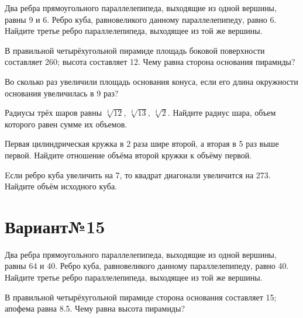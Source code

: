 \documentclass[4apaper]{article}
\begin{document}
\begin{taskBN}{1}
Два ребра прямоугольного параллелепипеда, выходящие из одной вершины, равны 9 и 6. Ребро куба, равновеликого данному параллелепипеду, равно 6. Найдите третье ребро параллелепипеда, выходящее из той же вершины.
\end{taskBN}

\begin{taskBN}{2}
В правильной четырёхугольной пирамиде площадь боковой поверхности составляет 260; высота составляет 12. Чему равна сторона основания пирамиды?
\end{taskBN}

\begin{taskBN}{3}
Во сколько раз увеличили площадь основания конуса, если его длина окружности основания увеличилась в 9 раз?
\end{taskBN}

\begin{taskBN}{4}
Радиусы трёх шаров равны $\sqrt[3]{12}$, $\sqrt[3]{13}$, $\sqrt[3]{2}$. Найдите радиус шара, объем которого равен сумме их объемов.
\end{taskBN}

\begin{taskBN}{5}
 Первая цилиндрическая кружка в 2 раза шире второй, а вторая в 5 раз выше первой. Найдите отношение объёма второй кружки к объёму первой.
\end{taskBN}

\begin{taskBN}{6}
Eсли ребро куба увеличить на 7, то квадрат диагонали увеличится на 273. Найдите объём исходного куба.
\end{taskBN}
\newpage\section*{Вариант№15}

\begin{taskBN}{1}
Два ребра прямоугольного параллелепипеда, выходящие из одной вершины, равны 64 и 40. Ребро куба, равновеликого данному параллелепипеду, равно 40. Найдите третье ребро параллелепипеда, выходящее из той же вершины.
\end{taskBN}

\begin{taskBN}{2}
В правильной четырёхугольной пирамиде сторона основания составляет 15; апофема равна 8.5. Чему равна высота пирамиды?
\end{taskBN}
\end{document}

